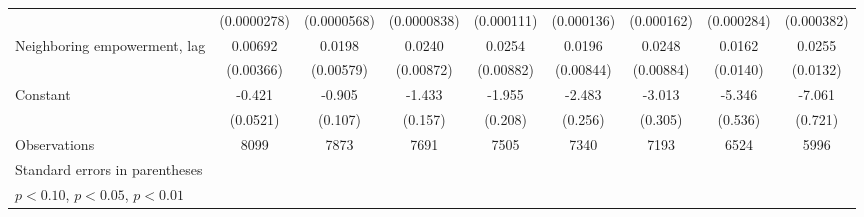 \begin{table}[htbp]
\begin{tabular}{l*{8}{c}}
                    & (0.0000278)         & (0.0000568)         & (0.0000838)         &  (0.000111)         &  (0.000136)         &  (0.000162)         &  (0.000284)         &  (0.000382)         \\
[1em]
Neighboring empowerment, lag&     0.00692\sym{*}  &      0.0198\sym{***}&      0.0240\sym{***}&      0.0254\sym{***}&      0.0196\sym{**} &      0.0248\sym{***}&      0.0162         &      0.0255\sym{*}  \\
                    &   (0.00366)         &   (0.00579)         &   (0.00872)         &   (0.00882)         &   (0.00844)         &   (0.00884)         &    (0.0140)         &    (0.0132)         \\
[1em]
Constant            &      -0.421\sym{***}&      -0.905\sym{***}&      -1.433\sym{***}&      -1.955\sym{***}&      -2.483\sym{***}&      -3.013\sym{***}&      -5.346\sym{***}&      -7.061\sym{***}\\
                    &    (0.0521)         &     (0.107)         &     (0.157)         &     (0.208)         &     (0.256)         &     (0.305)         &     (0.536)         &     (0.721)         \\
\hline
Observations        &        8099         &        7873         &        7691         &        7505         &        7340         &        7193         &        6524         &        5996         \\
\hline\hline
\multicolumn{9}{l}{\footnotesize Standard errors in parentheses}\\
\multicolumn{9}{l}{\footnotesize \sym{*} \(p<0.10\), \sym{**} \(p<0.05\), \sym{***} \(p<0.01\)}\\
\end{tabular}
\end{table}
